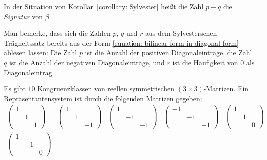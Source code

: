 \begin{definition}
  In der Situation von Korollar~\ref{corollary: Sylvester} heißt die Zahl $p - q$ die \emph{Signatur} von $\beta$.
\end{definition}

Man bemerke, dass sich die Zahlen $p$, $q$ und $r$ aus dem Sylvesterschen Trägheitssatz bereits aus der Form \eqref{equation: bilinear form in diagonal form} ablesen lassen:
Die Zahl $p$ ist die Anzahl der positiven Diagonaleinträge, die Zahl $q$ ist die Anzahl der negativen Diagonaleinträge, und $r$ ist die Häufigkeit von $0$ als Diagonaleintrag.

\begin{example}
  Es gibt $10$ Kongruenzklassen von reellen symmetrischen $(3 \times 3)$-Matrizen.
  Ein Repräsentantensystem ist durch die folgenden Matrizen gegeben:
  \[
    \begin{matrix}
      \begin{pmatrix}
        1 &   &   \\
          & 1 &   \\
          &   & 1
      \end{pmatrix}
    &
      \begin{pmatrix}
        1 &   &     \\
          & 1 &     \\
          &   & -1
      \end{pmatrix}
    &
      \begin{pmatrix}
        1 &     &     \\
          & -1  &     \\
          &     & -1
      \end{pmatrix}
    &
      \begin{pmatrix}
        -1  &     &     \\
            & -1  &     \\
            &     & -1
      \end{pmatrix}
    &
      \begin{pmatrix}
        1 &   &   \\
          & 1 &   \\
          &   & 0
      \end{pmatrix}
    \\[20pt]
      \begin{pmatrix}
        1 &    &   \\
          & -1 &   \\
          &    & 0
      \end{pmatrix}

\end{matrix}\]
\end{example}
